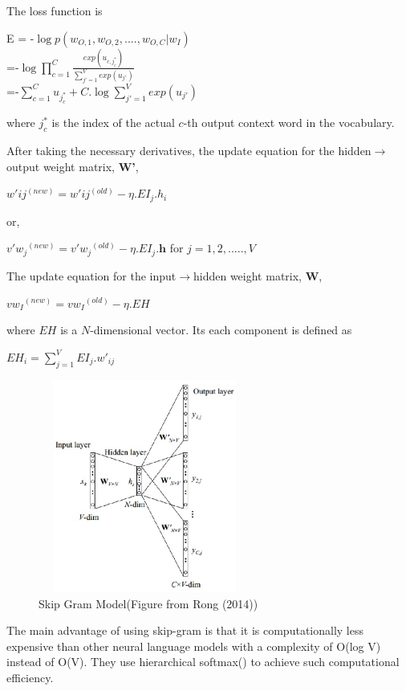 \documentclass[11pt,a4paper]{article}
\begin{document}
The loss function is
\begin{center}
E = -$\log p(w_{O,1},w_{O,2},....,w_{O,C}|w_I)$\\
=-$\log \prod_{c=1}^{C}\frac{exp(u_{c,j_{c}^{*	}})}{\sum_{j'=1}^{V}exp(u_{j'})}$\\
=-$\sum_{c=1}^{C} u_{j_{c}^{*}}+C.\log \sum_{j'=1}^{V}exp(u_{j'})$
\end{center}
where $j_{c}^{*}$ is the index of the actual $c$-th output context word in the vocabulary.

After taking the necessary derivatives, the update equation for the hidden$\rightarrow$output weight matrix, \textbf{W'},
\begin{center}
$w'{ij}^{(new)}=w'{ij}^{(old)}-\eta .EI_j.h_i$
\end{center}
or,
\begin{center}
$v'{w_j}^{(new)}=v'{w_j}^{(old)}-\eta .EI_j.\textbf{h}$ for $j=1,2,.....,V$
\end{center}

The update equation for the input$\rightarrow$hidden weight matrix, \textbf{W},
\begin{center}
$v{w_I}^{(new)}=v{w_I}^{(old)}-\eta .EH$
\end{center}
where $EH$ is a $N$-dimensional vector. Its each component is defined as
\begin{center}
$EH_i=\sum_{j=1}^{V}EI_j.w'_{ij}$
\end{center}

\begin{figure}[ht!]
\centering
\includegraphics[width=70mm, height=70mm]{img/skipgram.eps}
\caption{Skip Gram Model(Figure from Rong (2014)) \label{fig:skipgram}}
\end{figure}
The main advantage of using skip-gram is that it is computationally less expensive than other neural language models with a complexity of O(log V) instead of O(V). They use hierarchical softmax(\cite{Morin:05}) to achieve such computational efficiency.
\end{document}
